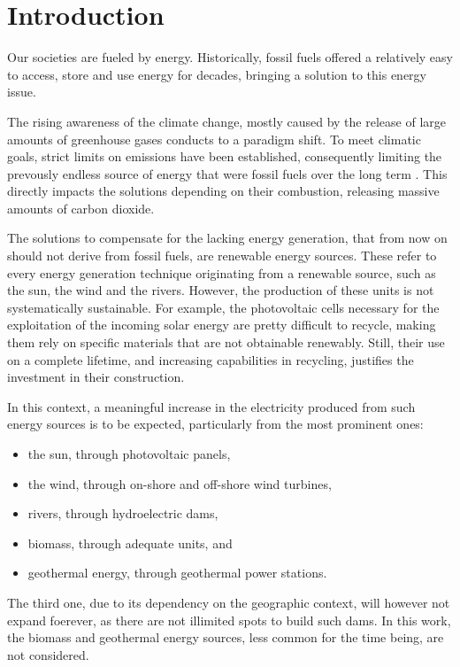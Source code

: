 \section{Introduction}

Our societies are fueled by energy. Historically, fossil fuels offered a relatively easy to access, store and use energy for decades, bringing a solution to this energy issue.

The rising awareness of the climate change, mostly caused by the release of large amounts of greenhouse gases conducts to a paradigm shift. To meet climatic goals, strict limits on emissions have been established, consequently limiting the prevously endless source of energy that were fossil fuels over the long term \cite{ar6-ipcc-wg3}. This directly impacts the solutions depending on their combustion, releasing massive amounts of carbon dioxide.

The solutions to compensate for the lacking energy generation, that from now on should not derive from fossil fuels, are renewable energy sources. These refer to every energy generation technique originating from a renewable source, such as the sun, the wind and the rivers. However, the production of these units is not systematically sustainable. For example, the photovoltaic cells necessary for the exploitation of the incoming solar energy are pretty difficult to recycle, making them rely on specific materials that are not obtainable renewably. Still, their use on a complete lifetime, and increasing capabilities in recycling, justifies the investment in their construction.

In this context, a meaningful increase in the electricity produced from such energy sources is to be expected, particularly from the most prominent ones:
\begin{itemize}
    \item the sun, through photovoltaic panels,
    \item the wind, through on-shore and off-shore wind turbines,
    \item rivers, through hydroelectric dams,
    \item biomass, through adequate units, and
    \item geothermal energy, through geothermal power stations.
\end{itemize}

The third one, due to its dependency on the geographic context, will however not expand foerever, as there are not illimited spots to build such dams. In this work, the biomass and geothermal energy sources, less common for the time being, are not considered.

